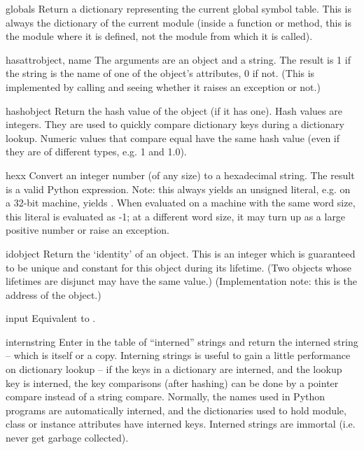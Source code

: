 \begin{funcdesc}{globals}{}
Return a dictionary representing the current global symbol table.
This is always the dictionary of the current module (inside a
function or method, this is the module where it is defined, not the
module from which it is called).
\end{funcdesc}

\begin{funcdesc}{hasattr}{object, name}
  The arguments are an object and a string.  The result is 1 if the
  string is the name of one of the object's attributes, 0 if not.
  (This is implemented by calling  and seeing whether it raises an exception or not.)
\end{funcdesc}

\begin{funcdesc}{hash}{object}
  Return the hash value of the object (if it has one).  Hash values
  are integers.  They are used to quickly compare dictionary
  keys during a dictionary lookup.  Numeric values that compare equal
  have the same hash value (even if they are of different types, e.g.
  1 and 1.0).
\end{funcdesc}

\begin{funcdesc}{hex}{x}
  Convert an integer number (of any size) to a hexadecimal string.
  The result is a valid Python expression.  Note: this always yields
  an unsigned literal, e.g. on a 32-bit machine,  yields
  .  When evaluated on a machine with the same
  word size, this literal is evaluated as -1; at a different word
  size, it may turn up as a large positive number or raise an
   exception.
\end{funcdesc}

\begin{funcdesc}{id}{object}
  Return the `identity' of an object.  This is an integer which is
  guaranteed to be unique and constant for this object during its
  lifetime.  (Two objects whose lifetimes are disjunct may have the
  same  value.)  (Implementation note: this is the
  address of the object.)
\end{funcdesc}

\begin{funcdesc}{input}{}
  Equivalent to .
\end{funcdesc}

\begin{funcdesc}{intern}{string}
  Enter  in the table of ``interned'' strings and return
  the interned string -- which is  itself or a copy.
  Interning strings is useful to gain a little performance on
  dictionary lookup -- if the keys in a dictionary are interned, and
  the lookup key is interned, the key comparisons (after hashing) can
  be done by a pointer compare instead of a string compare.  Normally,
  the names used in Python programs are automatically interned, and
  the dictionaries used to hold module, class or instance attributes
  have interned keys.  Interned strings are immortal (i.e. never get
  garbage collected).
\end{funcdesc}

